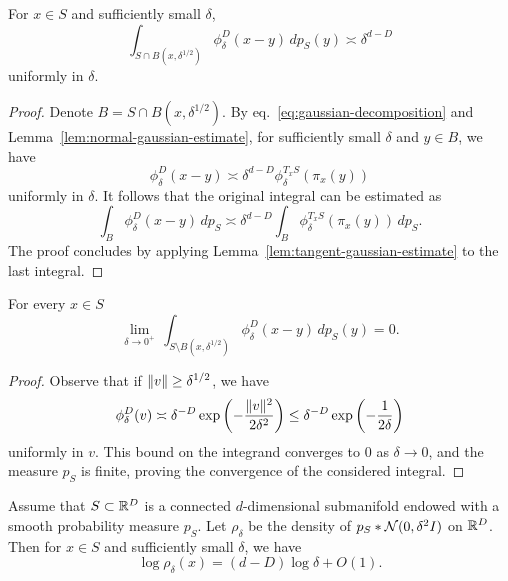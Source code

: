 \begin{lemma}
\label{lem:gaussian-estimate-on-ball}
    For $x\in S$ and sufficiently small $\delta$,
    \begin{equation}
        \int_{S\cap B(x,\delta^{1/2})} \phi^D_\delta(x-y)\, dp_S(y) \asymp \delta^{d-D}
    \end{equation}
    uniformly in $\delta$.
\end{lemma}

\begin{proof}
    Denote $B=S\cap B(x,\delta^{1/2})$. By eq.~\eqref{eq:gaussian-decomposition} and Lemma~\ref{lem:normal-gaussian-estimate}, for sufficiently small $\delta$ and $y\in B$, we have
    \begin{equation}
        \phi^D_\delta(x-y) \asymp \delta^{d-D} \phi^{T_xS}_\delta(\pi_x(y)) 
    \end{equation}
    uniformly in $\delta$. It follows that the original integral can be estimated as
    \begin{equation}
        \int_B \phi^D_\delta(x-y)\, dp_S \asymp \delta^{d-D} \int_B \phi^{T_xS}_\delta(\pi_x(y)) \, dp_S.
    \end{equation}
    The proof concludes by applying Lemma~\ref{lem:tangent-gaussian-estimate} to the last integral. 
\end{proof}

\begin{lemma}
\label{lem:gaussian-estimate-outside-ball}
    For every $x\in S$ 
    \begin{equation}
       \lim_{\delta\to 0^+}\,\int_{S\setminus B(x,\delta^{1/2})} \phi^D_\delta(x-y)\, dp_S(y) = 0.
    \end{equation}
\end{lemma}

\begin{proof}
    Observe that if $\lVert{v}\rVert \geq \delta^{1/2}$, we have
    \begin{equation}
        \phi^D_\delta(v) \asymp \delta^{-D} \exp \left(-\frac{\lVert{v}\rVert^2}{2\delta^2}\right) \leq \delta^{-D}\exp\left(-\frac{1}{2\delta}\right)
    \end{equation}
    uniformly in $v$. This bound on the integrand converges to $0$ as $\delta\to 0$, and the measure $p_S$ is finite, proving the convergence of the considered integral.
\end{proof}

\begin{theorem}
\label{thm:core-estimate}
    Assume that $S \subset \mathbb{R}^D$ is a connected $d$-dimensional submanifold endowed with a smooth probability measure $p_S$. Let $\rho_\delta$ be the density of $p_S * \mathcal{N}(0, \delta^2 I)$ on $\mathbb{R}^D$. Then for $x\in S$ and sufficiently small $\delta$, we have
    \begin{equation}
    \label{eq:core-estimate}
        \log\rho_\delta(x) = (d-D)\log\delta + O(1).
    \end{equation}
\end{theorem}

